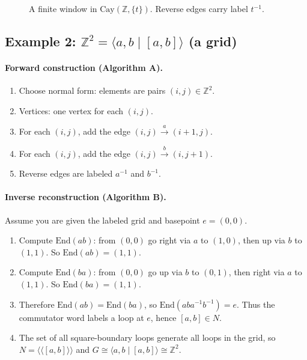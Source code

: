 \documentclass[11pt]{article}
\theoremstyle{definition}
\theoremstyle{plain}
\theoremstyle{remark}
\newcommand{\Cay}{\mathrm{Cay}}
\newcommand{\End}{\mathrm{End}}
\begin{document}
\begin{figure}[h]
\centering
{}
\caption{A finite window in $\Cay(\mathbb Z,\{t\})$. Reverse edges carry label $t^{-1}$.}
\end{figure}

\subsection*{Example 2: $\mathbb Z^2=\langle a,b\mid [a,b]\rangle$ (a grid)}
\paragraph{Forward construction (Algorithm A).}
\begin{enumerate}[leftmargin=2.2em]
\item Choose normal form: elements are pairs $(i,j)\in\mathbb Z^2$.
\item Vertices: one vertex for each $(i,j)$.
\item For each $(i,j)$, add the edge $(i,j)\xrightarrow{a}(i+1,j)$.
\item For each $(i,j)$, add the edge $(i,j)\xrightarrow{b}(i,j+1)$.
\item Reverse edges are labeled $a^{-1}$ and $b^{-1}$.
\end{enumerate}

\paragraph{Inverse reconstruction (Algorithm B).}
Assume you are given the labeled grid and basepoint $e=(0,0)$.
\begin{enumerate}[leftmargin=2.2em]
\item Compute $\End(ab)$: from $(0,0)$ go right via $a$ to $(1,0)$, then up via $b$ to $(1,1)$.
So $\End(ab)=(1,1)$.
\item Compute $\End(ba)$: from $(0,0)$ go up via $b$ to $(0,1)$, then right via $a$ to $(1,1)$.
So $\End(ba)=(1,1)$.
\item Therefore $\End(ab)=\End(ba)$, so $\End(aba^{-1}b^{-1})=e$.
Thus the commutator word labels a loop at $e$, hence $[a,b]\in N$.
\item The set of all square-boundary loops generate all loops in the grid, so $N=\langle\!\langle [a,b]\rangle\!\rangle$ and
$G\cong \langle a,b\mid [a,b]\rangle\cong\mathbb Z^2$.
\end{enumerate}
\end{document}
